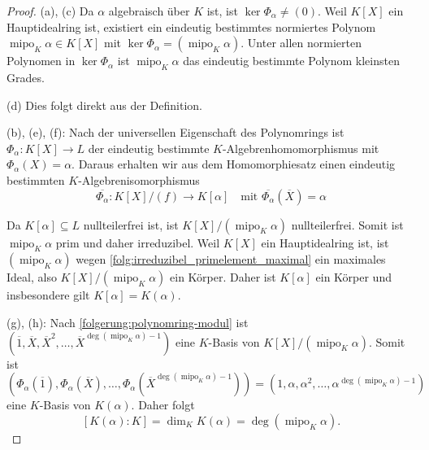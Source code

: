 \documentclass[a4paper, twoside, 11pt, ngerman]{report}
\DeclareMathOperator{\mipo}{mipo}
\theoremstyle{definistyle}
\theoremstyle{remark}
\begin{document}
\begin{proof}
(a), (c) Da $\alpha$ algebraisch über $K$ ist, ist $\ker \Phi_\alpha \neq (0)$. Weil $K[X]$ ein Hauptidealring ist, existiert ein eindeutig bestimmtes normiertes Polynom $\mipo_K\alpha \in K[X]$ mit $\ker \Phi_\alpha = (\mipo_K\alpha)$. Unter allen normierten Polynomen in $\ker \Phi_\alpha$ ist $\mipo_K\alpha$ das eindeutig bestimmte Polynom kleinsten Grades.

(d) Dies folgt direkt aus der Definition.

(b), (e), (f): Nach der universellen Eigenschaft des Polynomrings ist $\Phi_\alpha: K[X] \to L$ der eindeutig bestimmte $K$-Algebrenhomomorphismus mit $\Phi_\alpha(X) = \alpha$. Daraus erhalten wir aus dem Homomorphiesatz einen eindeutig bestimmten $K$-Algebrenisomorphismus
\[
\overline{\Phi_\alpha}\colon K[X] / (f) \to K[\alpha] \quad \text{mit } \overline{\Phi_\alpha}(\overline{X}) = \alpha
\]

Da $K[\alpha]\subseteq L$ nullteilerfrei ist, ist $K[X] / (\mipo_K\alpha)$ nullteilerfrei. Somit ist $\mipo_K\alpha$ prim und daher irreduzibel. Weil $K[X]$ ein Hauptidealring ist, ist $(\mipo_K\alpha)$ wegen \ref{folg:irreduzibel_primelement_maximal} ein maximales Ideal, also $K[X] / (\mipo_K\alpha)$ ein Körper. Daher ist $K[\alpha]$ ein Körper und insbesondere gilt $K[\alpha] = K(\alpha)$.

(g), (h): Nach \ref{folgerung:polynomring-modul} ist $(\overline{1}, \overline{X}, \overline{X}^2, \dots, \overline{X}^{\deg(\mipo_K\alpha)-1})$ eine $K$-Basis von $K[X] / (\mipo_K\alpha)$. Somit ist \[(\Phi_\alpha(\overline{1}),\Phi_\alpha(\overline{X}),\ldots,\Phi_\alpha(\overline{X}^{\deg(\mipo_K\alpha)-1})) =(1,\alpha, \alpha^2, \dots, \alpha^{\deg(\mipo_K\alpha)-1})\] eine $K$-Basis von $K(\alpha)$. Daher folgt 
\[[K(\alpha) : K] = \dim_K K(\alpha) = \deg(\mipo_K\alpha).\]
\end{proof}
\end{document}
